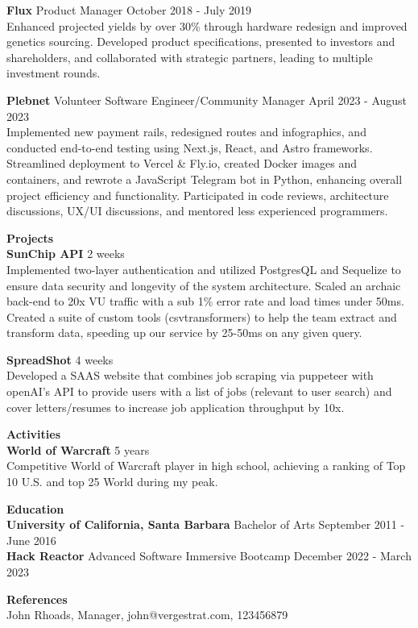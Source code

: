 \documentclass[10pt,a4paper]{article}
\begin{document}
\textbf{Flux} \hfill Product Manager \hfill October 2018 - July 2019 \\
Enhanced projected yields by over 30\% through hardware redesign and improved genetics sourcing. Developed product specifications, presented to investors and shareholders, and collaborated with strategic partners, leading to multiple investment rounds.

\textbf{Plebnet} \hfill Volunteer Software Engineer/Community Manager \hfill April 2023 - August 2023 \\
Implemented new payment rails, redesigned routes and infographics, and conducted end-to-end testing using Next.js, React, and Astro frameworks. Streamlined deployment to Vercel \& Fly.io, created Docker images and containers, and rewrote a JavaScript Telegram bot in Python, enhancing overall project efficiency and functionality. Participated in code reviews, architecture discussions, UX/UI discussions, and mentored less experienced programmers.

\textbf{\large Projects} \\
\textbf{SunChip API} \hfill 2 weeks \\
Implemented two-layer authentication and utilized PostgresQL and Sequelize to ensure data security and longevity of the system architecture. Scaled an archaic back-end to 20x VU traffic with a sub 1\% error rate and load times under 50ms. Created a suite of custom tools (csvtransformers) to help the team extract and transform data, speeding up our service by 25-50ms on any given query.

\textbf{SpreadShot} \hfill 4 weeks \\
Developed a SAAS website that combines job scraping via puppeteer with openAI's API to provide users with a list of jobs (relevant to user search) and cover letters/resumes to increase job application throughput by 10x.

\textbf{\large Activities} \\
\textbf{World of Warcraft} \hfill 5 years \\
Competitive World of Warcraft player in high school, achieving a ranking of Top 10 U.S. and top 25 World during my peak.

\textbf{\large Education} \\
\textbf{University of California, Santa Barbara} \hfill Bachelor of Arts \hfill September 2011 - June 2016 \\
\textbf{Hack Reactor} \hfill Advanced Software Immersive Bootcamp \hfill December 2022 - March 2023

\textbf{\large References} \\
John Rhoads, Manager, john@vergestrat.com, 123456879
\end{document}
